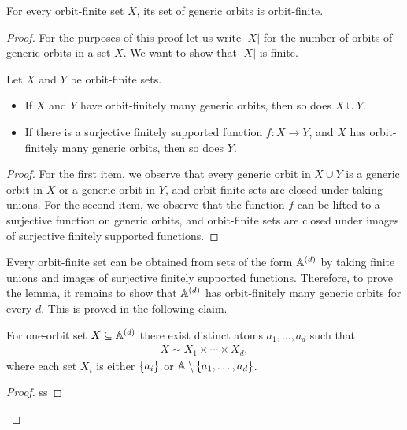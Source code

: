 \begin{lemma}
    \label{lem:orbit-finitely-many-generic-orbits} For every orbit-finite set $X$, its set of generic orbits is orbit-finite.
\end{lemma}
\begin{proof}
    For the purposes of this proof let us write $|X|$ for  the number of orbits of generic orbits in a set $X$. We want to show that $|X|$ is finite. 

    \begin{claim}
        Let $X$ and $Y$ be orbit-finite sets. 
        \begin{itemize}
            \item         If $X$ and $Y$ have orbit-finitely many generic orbits, then so does $X \cup Y$.
\item If there is a surjective finitely supported function $f: X \to Y$, and $X$ has  orbit-finitely many generic orbits, then so does $Y$.
        \end{itemize}
    \end{claim}
    \begin{proof}
        For the first item, we observe that every generic orbit in $X \cup Y$ is a generic orbit in $X$ or a generic orbit in $Y$, and orbit-finite sets are closed under taking unions.  For the second item, we observe that the function $f$ can be lifted to a surjective function on generic orbits, and orbit-finite sets are closed under images of surjective finitely supported functions.
    \end{proof}
    Every orbit-finite set can be obtained from sets of the form $\mathbb A^{(d)}$ by taking finite unions and images of surjective finitely supported functions. Therefore, to prove the lemma, it remains to show that $\mathbb A^{(d)}$ has orbit-finitely many generic orbits for every $d$. This is proved in the following claim.
    \begin{claim}
        For  one-orbit set $X \subseteq \mathbb A^{(d)}$ there exist distinct atoms $a_1,\ldots,a_d$ such that 
        \begin{align*}
        X \sim X_1 \times \cdots \times X_d,
        \end{align*}
        where each set $X_i$ is either $\{a_i\}$ or $\mathbb A \setminus \{a_1,\ldots,a_d\}$. 
    \end{claim}
    \begin{proof}
        ss
    \end{proof}
\end{proof}

